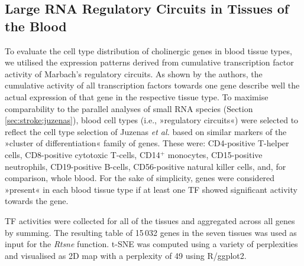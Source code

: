 \begin{method}

\subsection{Large RNA Regulatory Circuits in Tissues of the Blood}
To evaluate the cell type distribution of cholinergic genes in blood tissue types, we utilised the expression patterns derived from cumulative transcription factor activity of Marbach's regulatory circuits.\cite{Marbach2016} As shown by the authors, the cumulative activity of all transcription factors towards one gene describe well the actual expression of that gene in the respective tissue type. To maximise comparability to the parallel analyses of small RNA species (Section \ref{sec:stroke:juzenas}), blood cell types (i.e., »regulatory circuits«) were selected to reflect the cell type selection of Juzenas \emph{et al.}\cite{Juzenas2017} based on similar markers of the »cluster of differentiation« family of genes. These were: CD4-positive T-helper cells, CD8-positive cytotoxic T-cells, CD14$^+$ monocytes, CD15-positive neutrophils, CD19-positive B-cells, CD56-positive natural killer cells, and, for comparison, whole blood. For the sake of simplicity, genes were considered »present« in each blood tissue type if at least one TF showed significant activity towards the gene.

TF activities were collected for all of the tissues and aggregated across all genes by summing. The resulting table of 15\,032 genes in the seven tissues was used as input for the \emph{Rtsne} function.\cite{Krijthe2015} t-SNE was computed using a variety of perplexities and visualised as 2D map with a perplexity of 49 using R/ggplot2.\cite{Wickham2016}


\end{method}

